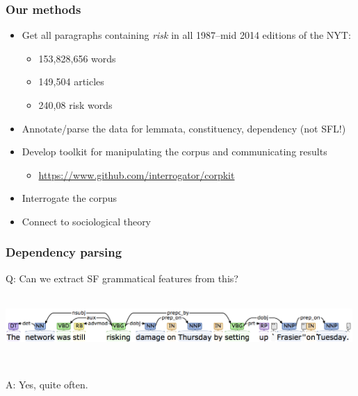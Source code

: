 \documentclass{beamer}       %
\begin{document}
\begin{frame}
    \frametitle{Our methods}
    
    \begin{itemize}
    \item Get all paragraphs containing \emph{risk} in all 1987--mid 2014 editions of the NYT:
    \begin{itemize}
    \item 153,828,656 words
    \item 149,504 articles
    \item 240,08 risk words
    \end{itemize}
    \item Annotate\slash parse the data for lemmata, constituency, dependency (not SFL!)
    \item Develop toolkit for manipulating the corpus and communicating results
    \begin{itemize}
        \item \url{https://www.github.com/interrogator/corpkit}
    \end{itemize}
    \item Interrogate the corpus
    \item Connect to sociological theory
    \end{itemize}
\end{frame}


\begin{frame}
    \frametitle{Dependency parsing}

    Q: Can we extract SF grammatical features from this? 

    ~\\

    \centering
    \includegraphics[width=0.99\textwidth]{../images/depparse}

    ~\\
    
    \raggedright
    A: Yes, quite often.
\end{frame}
\end{document}
